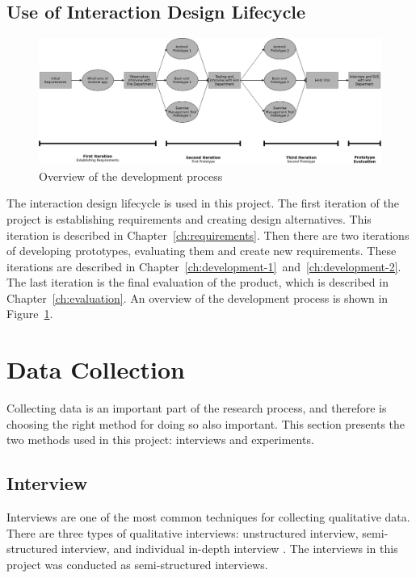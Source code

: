 \documentclass[../Main/thesis.tex]{subfiles}
\begin{document}
\subsection{Use of Interaction Design Lifecycle}
\begin{figure}[h]
	\centering
	\includegraphics[width=\textwidth]{../fig/Method-diagram}
	\caption{Overview of the development process}
	\label{fig:method-diagram}
\end{figure}

The interaction design lifecycle is used in this project.
The first iteration of the project is establishing requirements and creating design alternatives.
This iteration is described in Chapter~\ref{ch:requirements}.
Then there are two iterations of developing prototypes, evaluating them and create new requirements.
These iterations are described in Chapter~\ref{ch:development-1}~and~\ref{ch:development-2}.
The last iteration is the final evaluation of the product, which is described in Chapter~\ref{ch:evaluation}.
An overview of the development process is shown in Figure~\ref{fig:method-diagram}.

\section{Data Collection}
Collecting data is an important part of the research process, and therefore is choosing the right method for doing so also important.
This section presents the two methods used in this project: interviews and experiments.

\subsection{Interview}
Interviews are one of the most common techniques for collecting qualitative data.
There are three types of qualitative interviews: unstructured interview, semi-structured interview, and individual in-depth interview \citep{DiCicco-Bloom2006}.
The interviews in this project was conducted as semi-structured interviews.
\end{document}
